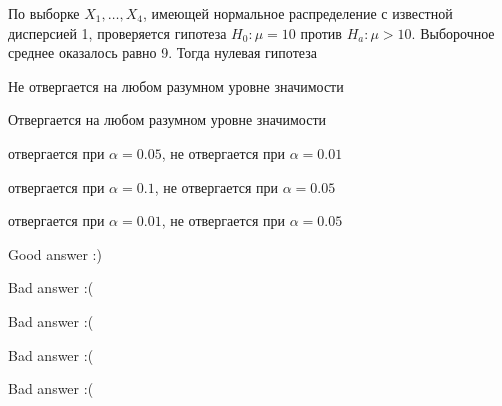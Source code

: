 
\begin{question}
По выборке \(X_1,\ldots,X_{4}\), имеющей нормальное распределение с
известной дисперсией 1, проверяется гипотеза \(H_0: \mu = 10\) против
\(H_a: \mu > 10\). Выборочное среднее оказалось равно 9. Тогда нулевая
гипотеза
\begin{answerlist}
  \item Не отвергается на любом разумном уровне значимости
  \item Отвергается на любом разумном уровне значимости
  \item отвергается при \(\alpha = 0.05\), не отвергается при \(\alpha = 0.01\)
  \item отвергается при \(\alpha = 0.1\), не отвергается при \(\alpha = 0.05\)
  \item отвергается при \(\alpha = 0.01\), не отвергается при \(\alpha = 0.05\)
\end{answerlist}
\end{question}

\begin{solution}
\begin{answerlist}
  \item Good answer :)
  \item Bad answer :(
  \item Bad answer :(
  \item Bad answer :(
  \item Bad answer :(
\end{answerlist}
\end{solution}

